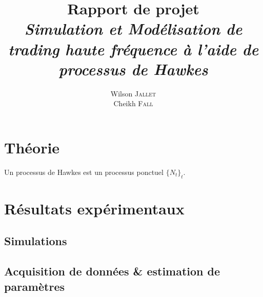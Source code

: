 \documentclass[11pt,twoside]{article}
\title{\textbf{Rapport de projet}\\
  \textit{Simulation et Modélisation de trading haute fréquence à l’aide de processus de Hawkes}
}
\author{
  Wilson \textsc{Jallet}\\
  Cheikh \textsc{Fall}
}
\begin{document}
\maketitle

\section{Théorie}

Un processus de Hawkes est un processus ponctuel $\{N_t\}_{t}$.

\section{Résultats expérimentaux}

\subsection{Simulations}

\subsection{Acquisition de données \& estimation de paramètres}
\end{document}

